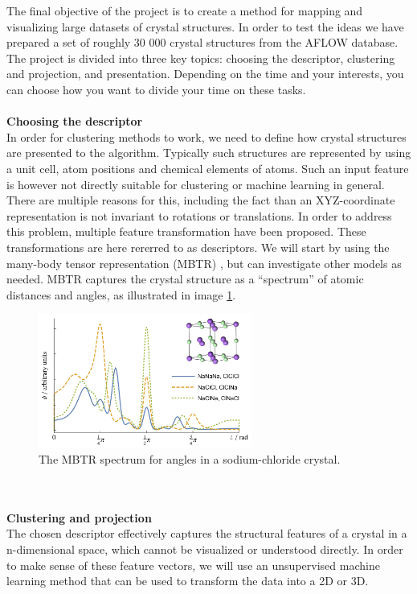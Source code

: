 \documentclass[12pt,a4paper,oneside]{article}	%
\newcommand{\+}[1]{\ensuremath{\mathbf{#1}}}		%
\begin{document}
The final objective of the project is to create a method for mapping and visualizing large datasets of crystal structures. In order to test the ideas we have prepared a set of roughly 30 000 crystal structures from the AFLOW database\cite{aflow1}. The project is divided into three key topics: choosing the descriptor, clustering and projection, and presentation. Depending on the time and your interests, you can choose how you want to divide your time on these tasks.
\\\\
\noindent\textbf{Choosing the descriptor}\\
In order for clustering methods to work, we need to define how crystal structures are presented to the algorithm. Typically such structures are represented by using a unit cell, atom positions and chemical elements of atoms. Such an input feature is however not directly suitable for clustering or machine learning in general. There are multiple reasons for this, including the fact than an XYZ-coordinate representation is not invariant to rotations or translations. In order to address this problem, multiple feature transformation have been proposed\cite{cm, mbtr, soap, voronoi, acsf}. These transformations are here rererred to as descriptors. We will start by using the many-body tensor representation (MBTR) \cite{mbtr}, but can investigate other models as needed. MBTR captures the crystal structure as a ``spectrum'' of atomic distances and angles, as illustrated in image \ref{fig:mbtr}.
\begin{figure}[h!]
  \centering
  \includegraphics[width=7cm]{mbtr.jpg}
  \caption{The MBTR spectrum for angles in a sodium-chloride crystal.}
  \label{fig:mbtr}
\end{figure}
\\\\
\noindent\textbf{Clustering and projection}\\
The chosen descriptor effectively captures the structural features of a crystal in a n-dimensional space, which cannot be visualized or understood directly. In order to make sense of these feature vectors, we will use an unsupervised machine learning method that can be used to transform the data into a 2D or 3D.
\end{document}
